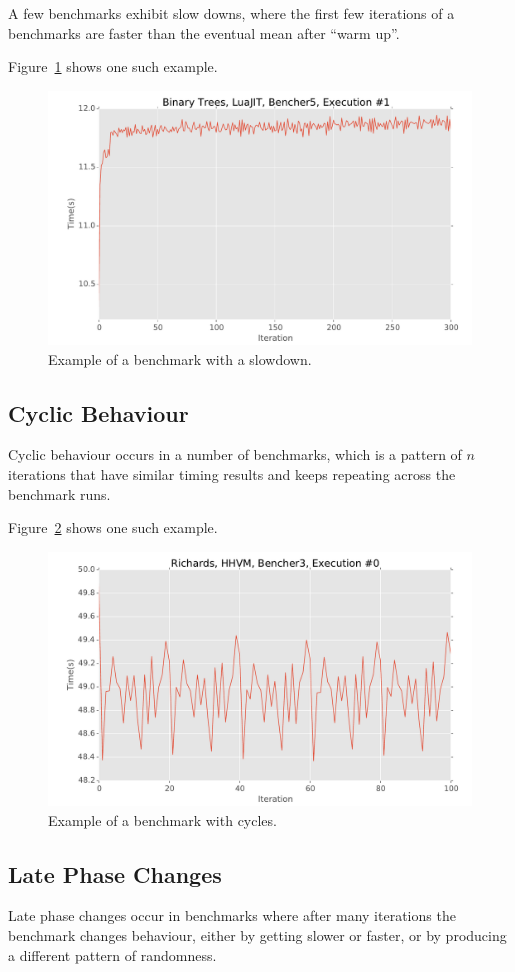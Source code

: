 \documentclass[10pt,preprint]{sigplanconf}
\begin{document}
A few benchmarks exhibit slow downs, where the first few iterations of a
benchmarks are faster than the eventual mean after ``warm up''.

Figure~\ref{fig:examples:slowdown1} shows one such example.

\begin{figure}[h!]
\centering
\includegraphics[width=.46\textwidth]{examples/slowdown1}
\caption{Example of a benchmark with a slowdown.}
\label{fig:examples:slowdown1}
\end{figure}



\subsection{Cyclic Behaviour}
\label{sub:cyclic}

Cyclic behaviour occurs in a number of benchmarks, which is a pattern of $n$
iterations that have similar timing results and keeps repeating across the
benchmark runs.

Figure~\ref{fig:examples:cycles1} shows one such example.

\begin{figure}[h!]
\centering
\includegraphics[width=.46\textwidth]{examples/cycles1}
\caption{Example of a benchmark with cycles.}
\label{fig:examples:cycles1}
\end{figure}


\subsection{Late Phase Changes}
\label{sub:phase}

Late phase changes occur in benchmarks where after many iterations the benchmark
changes behaviour, either by getting slower or faster, or by producing a
different pattern of randomness.
\end{document}
